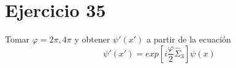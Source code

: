 \section*{Ejercicio 35}
Tomar $\varphi=2\pi,4\pi$ y obtener ${\psi}'({x}')$ a partir de la ecuación
\begin{equation*}
    {\psi}'({x}') = exp\left[i\frac{\varphi}{2}\hat{\Sigma}_3\right] \psi(x)
\end{equation*}